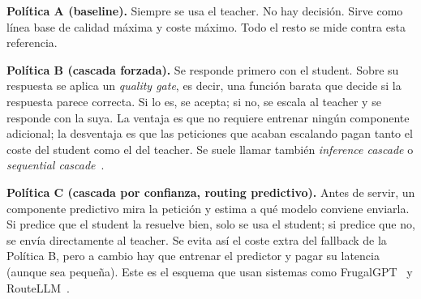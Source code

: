 \textbf{Política A (baseline).} Siempre se usa el teacher. No hay decisión. Sirve como línea base de calidad máxima y coste máximo. Todo el resto se mide contra esta referencia.

\textbf{Política B (cascada forzada).} Se responde primero con el student. Sobre su respuesta se aplica un \textit{quality gate}, es decir, una función barata que decide si la respuesta parece correcta. Si lo es, se acepta; si no, se escala al teacher y se responde con la suya. La ventaja es que no requiere entrenar ningún componente adicional; la desventaja es que las peticiones que acaban escalando pagan tanto el coste del student como el del teacher. Se suele llamar también \textit{inference cascade} o \textit{sequential cascade}~\cite{chen2023frugalgpt}.

\textbf{Política C (cascada por confianza, routing predictivo).} Antes de servir, un componente predictivo mira la petición y estima a qué modelo conviene enviarla. Si predice que el student la resuelve bien, solo se usa el student; si predice que no, se envía directamente al teacher. Se evita así el coste extra del fallback de la Política B, pero a cambio hay que entrenar el predictor y pagar su latencia (aunque sea pequeña). Este es el esquema que usan sistemas como FrugalGPT~\cite{chen2023frugalgpt} y RouteLLM~\cite{dekoninck2024routing}.

